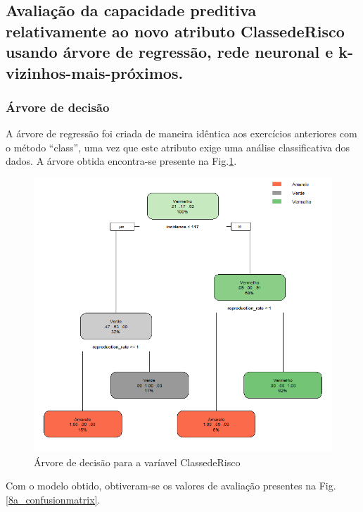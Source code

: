\documentclass[conference]{IEEEtran}
\begin{document}
\subsection{Avaliação da capacidade preditiva relativamente ao novo atributo ClassedeRisco usando árvore de regressão, rede neuronal e k-vizinhos-mais-próximos.}
\subsubsection{Árvore de decisão}
A árvore de regressão foi criada de maneira idêntica aos exercícios anteriores com o método “class”, uma vez que este atributo exige uma análise classificativa dos dados. A árvore obtida encontra-se presente na Fig.\ref{8a_rpart}.
\begin{figure}[htbp]
\centerline{\includegraphics[width=0.95\columnwidth]{images/08_1.png}}
\caption{Árvore de decisão para a varíavel ClassedeRisco}
\label{8a_rpart}
\end{figure}
Com o modelo obtido, obtiveram-se os valores de avaliação presentes na Fig.\ref{8a_confusionmatrix}.
\end{document}
